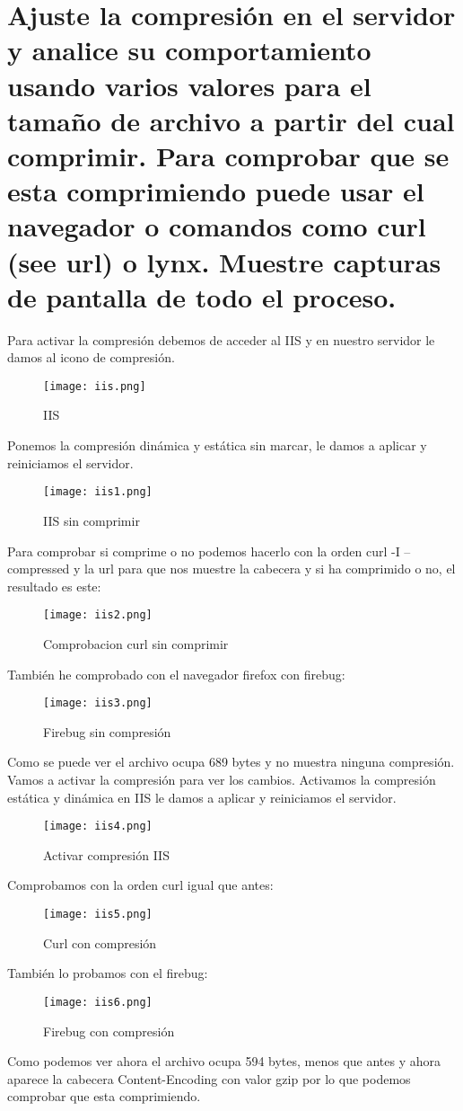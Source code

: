 \section{Ajuste la compresión en el servidor y analice su comportamiento usando varios valores para el tamaño de archivo a partir del cual comprimir. Para comprobar que se esta comprimiendo puede usar el navegador o comandos como curl (see url) o lynx. Muestre capturas de pantalla de todo el proceso.}
Para activar la compresión debemos de acceder al IIS y en nuestro servidor le damos al icono de compresión.
\begin{figure}[H] 
\centering
\texttt{[image: iis.png]}  
\label{figura6:}
\caption{IIS}
\end{figure} 
Ponemos la compresión dinámica y estática sin marcar, le damos a aplicar y reiniciamos el servidor.
\begin{figure}[H] 
\centering
\texttt{[image: iis1.png]}  
\label{figura7:}
\caption{IIS sin comprimir}
\end{figure}
Para comprobar si comprime o no podemos hacerlo con la orden curl -I --compressed y la url para que nos muestre la cabecera y si ha comprimido o no, el resultado es este:
\begin{figure}[H] 
\centering
\texttt{[image: iis2.png]}  
\label{figura8:}
\caption{Comprobacion curl sin comprimir}
\end{figure}
También he comprobado con el navegador firefox con firebug:
\begin{figure}[H] 
\centering
\texttt{[image: iis3.png]}  
\label{figura9:}
\caption{Firebug sin compresión}
\end{figure}
Como se puede ver el archivo ocupa 689 bytes y no muestra ninguna compresión. Vamos a activar la compresión para ver los cambios.
Activamos la compresión estática y dinámica en IIS le damos a aplicar y reiniciamos el servidor.
\begin{figure}[H] 
\centering
\texttt{[image: iis4.png]}  
\label{figura10:}
\caption{Activar compresión IIS}
\end{figure}
Comprobamos con la orden curl igual que antes:
\begin{figure}[H] 
\centering
\texttt{[image: iis5.png]}  
\label{figura11:}
\caption{Curl con compresión}
\end{figure}
También lo probamos con el firebug:
\begin{figure}[H] 
\centering
\texttt{[image: iis6.png]}  
\label{figura12:}
\caption{Firebug con compresión}
\end{figure}
Como podemos ver ahora el archivo ocupa 594 bytes, menos que antes y ahora aparece la cabecera Content-Encoding con valor gzip por lo que podemos comprobar que esta comprimiendo.

